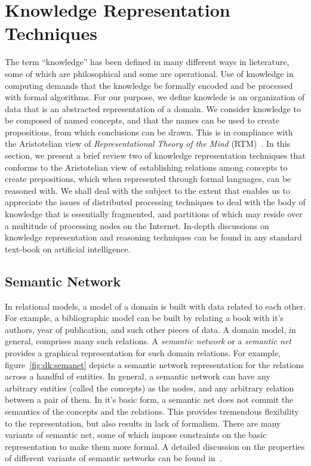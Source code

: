 \section{Knowledge Representation Techniques} 

The term ``knowledge'' has been defined in many different ways in lieterature, some of which are philosophical and some are
operational. Use of knowledge in computing demands that the knowledge be formally encoded and be processed with formal algorithms.
For our purpose, we define knowlede is an organization of data that is an abstracted representation of a domain. We consider 
knowledge to be composed of named concepts, and that the names can be used to create propositions, from which conclusions can 
be drawn. This is in compliance with the Aristotelian view of {\em Representational Theory of the Mind} (RTM)~\citep{Stanford:2020}. 
%
In this section, we present a brief review two of knowledge representation techniques that conforms to the Aristotelian view
of establishing relations among concepts to create prepositions, which when represented through formal languages, can be
reasoned with. We shall deal with the subject to the extent that enables us to appreciate the issues of distributed processing 
techniques to deal with the body of knowledge that is essentially fragmented, and partitions of which may reside over a multitude 
of processing nodes on the Internet. In-depth discussions on knowledge representation and reasoning techniques can be found in any 
standard text-book on artificial intelligence.

\subsection{Semantic Network}

 
In relational models, a model of a domain is built with data related to each other. For example, a bibliographic model can be
built by relating a book with it's authors, year of publication, and such other pieces of data. A domain model, in general,
comprises many such relations. A {\em semantic network} or a {\em semantic net} provides a graphical representation for such domain 
relations. For example, figure~\ref{fig:dk:semanet} depicts a semantic network representation for the relations across a handful 
of entities. 
%
 
In general, a semantic network can have any arbitrary entities (called the concepts) as the nodes, and any arbitrary relation between 
a pair of them. In it's basic form, a semantic net does not commit the semantics of the concepts and the relations. This provides 
tremendous flexibility to the representation, but also results in lack of formalism. There are many variants of semantic net, some 
of which impose constraints on the basic representation to make them more formal. A detailed discussion on the properties of different 
variants of semantic networks can be found in~\cite{Sowa:1992}.

